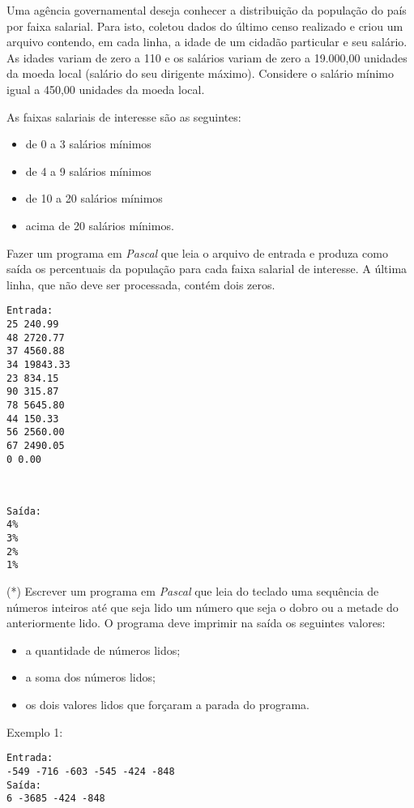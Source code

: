 \item
Uma agência governamental deseja conhecer a distribuição da população do
país por faixa salarial. Para isto, coletou dados do
último censo realizado e criou um arquivo contendo, em cada linha, a
idade de um cidadão particular e seu salário. As idades variam de zero a
110 e os salários variam de zero a 19.000,00 unidades da moeda local
(salário do seu dirigente máximo). Considere o salário mínimo igual a 450,00 unidades da moeda local.

As faixas salariais de interesse são as seguintes:
\begin{itemize}
\item de 0 a 3 salários mínimos
\item de 4 a 9 salários mínimos
\item de 10 a 20 salários mínimos
\item acima de 20 salários mínimos.
\end{itemize}
Fazer um programa em \emph{Pascal} que leia o arquivo de entrada e produza como
saída os percentuais da população para cada faixa salarial
de interesse. A última linha, que não deve ser processada, contém dois zeros.

\begin{minipage}{5cm}
\begin{verbatim}
Entrada:
25 240.99
48 2720.77
37 4560.88
34 19843.33
23 834.15
90 315.87
78 5645.80
44 150.33
56 2560.00
67 2490.05
0 0.00  
\end{verbatim}
\end{minipage} \
\begin{minipage}{5cm}
\begin{verbatim}
Saída:
4%
3%
2%
1%
\end{verbatim}
\end{minipage}

\item (*) Escrever um programa em \emph{Pascal} que leia do teclado
uma sequência de números inteiros até que seja lido um número
que seja o dobro ou a metade do anteriormente lido.
O programa deve imprimir na saída os seguintes valores:
\begin{itemize}
\item a quantidade de números lidos;
\item a soma dos números lidos;
\item os dois valores lidos que forçaram a parada do programa.
\end{itemize}

Exemplo 1:
\begin{verbatim}
Entrada:
-549 -716 -603 -545 -424 -848
Saída:
6 -3685 -424 -848
\end{verbatim}

